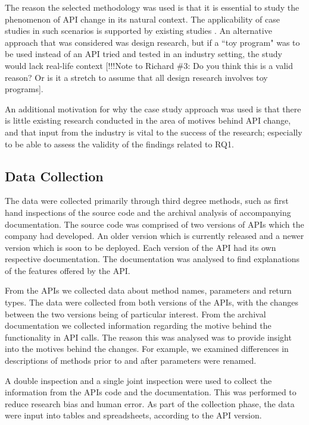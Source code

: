 \documentclass[10pt,twocolumn]{article}
\begin{document}
The reason the selected methodology was used is that it is essential to study the phenomenon of API change in its natural context. The applicability of case studies in such scenarios is supported by existing studies \cite{runeson2009guidelines} \cite{benbasat1987case} \cite{yin2013case} \cite{robson2002real}. An alternative approach that was considered was design research, but if a ``toy program" was to be used instead of an API tried and tested in an industry setting, the study would lack real-life context \cite{runeson2009guidelines} [!!!Note to Richard \#3: Do you think this is a valid reason? Or is it a stretch to assume that all design research involves toy programs]. 

An additional motivation for why the case study approach was used is that there is little existing research conducted in the area of motives behind API change, and that input from the industry is vital to the success of the research; especially to be able to assess the validity of the findings related to RQ1. 

\subsection{Data Collection}
The data were collected primarily through third degree methods, such as first hand inspections of the source code and the archival analysis of accompanying  documentation. The source code was comprised of two versions of APIs which the company had developed. An older version which is currently released and a newer version which is soon to be deployed. Each version of the API had its own respective documentation. The documentation was analysed to find explanations of the features offered by the API.

From the APIs we collected data about method names, parameters and return types. The data were collected from both versions of the APIs, with the changes between the two versions being of particular interest. From the archival documentation we collected information regarding the motive behind the functionality in API calls. The reason this was analysed was to provide insight into the motives behind the changes. For example, we examined differences in descriptions of methods prior to and after parameters were renamed.

A double inspection and a single joint inspection were used to collect the information from the APIs code and the documentation. This was performed to reduce research bias and human error. As part of the collection phase, the data were input into tables and spreadsheets, according to the API version.
\end{document}
